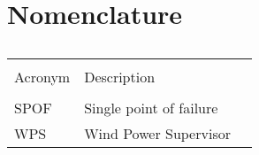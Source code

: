 \chapter{Nomenclature}


\begin{table}[ht]
\caption[Nomenclature]{\textsc{}} %
\centering %
\begin{tabular}{l l l} %
\hline\hline\\ %
 Acronym & Description \\ [0.5ex] %
\hline\\ %

	SPOF & Single point of failure \\
	WPS &  Wind Power Supervisor\\[1ex] %

\hline %
\end{tabular}
\normalsize
\label{table:nomenclature} %
\end{table}


